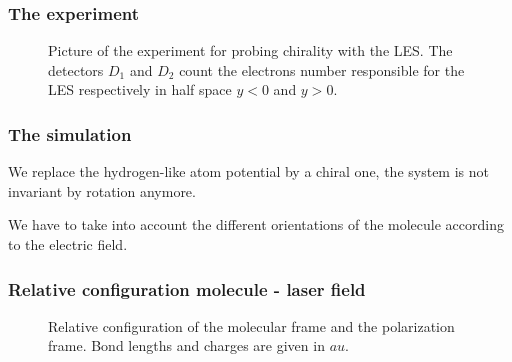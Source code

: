 \documentclass{beamer}
\begin{document}

\begin{frame}
\frametitle{The experiment}
\begin{figure}[htp]
 \resizebox{0.8\textwidth}{!}{}
 \caption{Picture of the experiment for probing chirality with the LES. The detectors $D_{1}$ and $D_{2}$ count the electrons number responsible for the LES respectively in half space $y<0$ and $y>0$.}
 \label{experiment}
\end{figure}
\end{frame}


\begin{frame}
\frametitle{The simulation}
\begin{block}{}
We replace the hydrogen-like atom potential by a chiral one, the system is not invariant by rotation anymore.
\end{block}
\begin{block}{}
We have to take into account the different orientations of the molecule according to the electric field.
\end{block}
\end{frame}


\begin{frame}
\frametitle{Relative configuration molecule - laser field}

\begin{figure}[htp]
\resizebox{0.7\textwidth}{!}{}
\caption{Relative configuration of the molecular frame and the polarization frame. Bond lengths and charges are given in $au$.}
\label{frames_molecular_laboratory}
\end{figure}

\end{frame}

\end{document}
